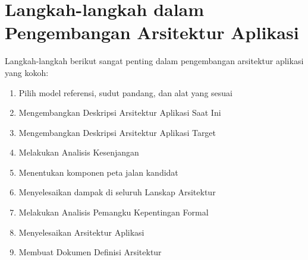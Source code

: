 \section{Langkah-langkah dalam Pengembangan Arsitektur Aplikasi}
Langkah-langkah berikut sangat penting dalam pengembangan arsitektur aplikasi yang kokoh:

\begin{enumerate}
	\item Pilih model referensi, sudut pandang, dan alat yang sesuai
	\item Mengembangkan Deskripsi Arsitektur Aplikasi Saat Ini
	\item Mengembangkan Deskripsi Arsitektur Aplikasi Target
	\item Melakukan Analisis Kesenjangan
	\item Menentukan komponen peta jalan kandidat
	\item Menyelesaikan dampak di seluruh Lanskap Arsitektur
	\item Melakukan Analisis Pemangku Kepentingan Formal
	\item Menyelesaikan Arsitektur Aplikasi
	\item Membuat Dokumen Definisi Arsitektur
\end{enumerate}

